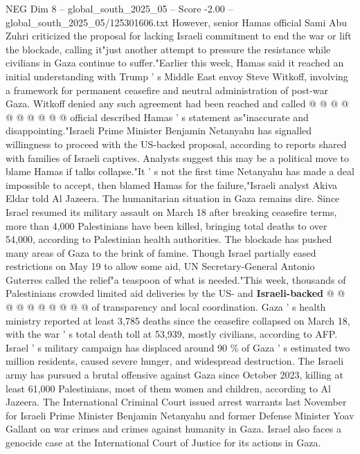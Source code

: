\begin{textsample}{NEG Dim 8 – global\_south\_2025\_05 – Score -2.00 – global\_south\_2025\_05/125301606.txt}
However, senior Hamas official Sami Abu Zuhri criticized the proposal for lacking Israeli commitment to end the war or lift the blockade, calling it"just another attempt to pressure the resistance while civilians in Gaza continue to suffer."Earlier this week, Hamas said it reached an initial understanding with Trump ' s Middle East envoy Steve Witkoff, involving a framework for permanent ceasefire and neutral administration of post-war Gaza.
Witkoff denied any such agreement had been reached and called @ @ @ @ @ @ @ @ @ @ official described Hamas ' s statement as"inaccurate and disappointing."Israeli Prime Minister Benjamin Netanyahu has signalled willingness to proceed with the US-backed proposal, according to reports shared with families of Israeli captives.
Analysts suggest this may be a political move to blame Hamas if talks collapse."It ' s not the first time Netanyahu has made a deal impossible to accept, then blamed Hamas for the failure,"Israeli analyst Akiva Eldar told Al Jazeera.
The humanitarian situation in Gaza remains dire.
Since Israel resumed its military assault on March 18 after breaking ceasefire terms, more than 4,000 Palestinians have been killed, bringing total deaths to over 54,000, according to Palestinian health authorities.
The blockade has pushed many areas of Gaza to the brink of famine.
Though Israel partially eased restrictions on May 19 to allow some aid, UN Secretary-General Antonio Guterres called the relief"a teaspoon of what is needed."This week, thousands of Palestinians crowded limited aid deliveries by the US- and \textbf{Israeli-backed} @ @ @ @ @ @ @ @ @ @ of transparency and local coordination.
Gaza ' s health ministry reported at least 3,785 deaths since the ceasefire collapsed on March 18, with the war ' s total death toll at 53,939, mostly civilians, according to AFP.
Israel ' s military campaign has displaced around 90 \% of Gaza ' s estimated two million residents, caused severe hunger, and widespread destruction.
The Israeli army has pursued a brutal offensive against Gaza since October 2023, killing at least 61,000 Palestinians, most of them women and children, according to Al Jazeera.
The International Criminal Court issued arrest warrants last November for Israeli Prime Minister Benjamin Netanyahu and former Defense Minister Yoav Gallant on war crimes and crimes against humanity in Gaza.
Israel also faces a genocide case at the International Court of Justice for its actions in Gaza.

\end{textsample}
